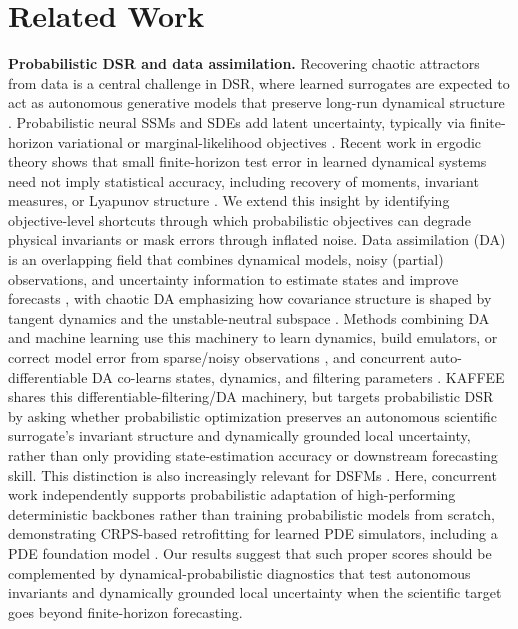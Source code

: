 \documentclass{article}
\theoremstyle{plain}
\theoremstyle{definition}
\theoremstyle{remark}
\begin{document}
\section{Related Work}
\label{sec:related_work}

\textbf{Probabilistic DSR and data assimilation.} 
Recovering chaotic attractors from data is a central challenge in DSR, where learned surrogates are expected to act as autonomous generative models that preserve long-run dynamical structure \citep{levine2022framework,durstewitz2023reconstructing,goering2024outofdomain,durstewitz2026position,sip2026double}. Probabilistic neural SSMs and SDEs add latent uncertainty, typically via finite-horizon variational or marginal-likelihood objectives \citep{brenner2022tractable,li2020scalable}. Recent work in ergodic theory shows that small finite-horizon test error in learned dynamical systems need not imply statistical accuracy, including recovery of moments, invariant measures, or Lyapunov structure \citep{park2024when}. We extend this insight by identifying objective-level shortcuts through which probabilistic objectives can degrade physical invariants or mask errors through inflated noise. Data assimilation (DA) is an overlapping field that combines dynamical models, noisy (partial) observations, and uncertainty information to estimate states and improve forecasts \citep{reich2015probabilistic,carrassi2018data}, with chaotic DA emphasizing how covariance structure is shaped by tangent dynamics and the unstable-neutral subspace \citep{trevisan2011kalman,carrassi2022data}. Methods combining DA and machine learning use this machinery to learn dynamics, build emulators, or correct model error from sparse/noisy observations \citep{brajard2020combining,bocquet2021online,farchi2021comparison,levine2022framework,bocquet2024accurate}, and concurrent auto-differentiable DA co-learns states, dynamics, and filtering parameters \citep{adrian2026autodifferentiable}. KAFFEE shares this differentiable-filtering/DA machinery, but targets probabilistic DSR by asking whether probabilistic optimization preserves an autonomous scientific surrogate's invariant structure and dynamically grounded local uncertainty, rather than only providing state-estimation accuracy or downstream forecasting skill. This distinction is also increasingly relevant for DSFMs \citep{hemmer2025true,lai2026panda,liu2025chaosnexus}. Here, concurrent work independently supports probabilistic adaptation of high-performing deterministic backbones rather than training probabilistic models from scratch, demonstrating CRPS-based retrofitting for learned PDE simulators, including a PDE foundation model \citep{diaconu2026probabilistic}. Our results suggest that such proper scores should be complemented by dynamical-probabilistic diagnostics that test autonomous invariants and dynamically grounded local uncertainty when the scientific target goes beyond finite-horizon forecasting.
\end{document}
